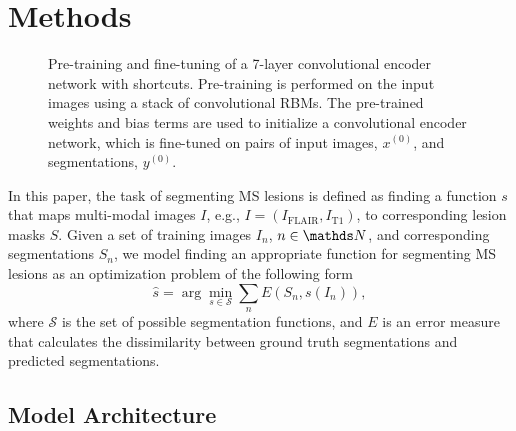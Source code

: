 \section{Methods}
\label{sec:method}

\begin{figure*}[tb]
\centering


\caption{Pre-training and fine-tuning of a 7-layer convolutional encoder network
with shortcuts. Pre-training is performed on the input images using a stack of
convolutional RBMs. The pre-trained weights and bias terms are used to initialize
a convolutional encoder network, which is fine-tuned on pairs of input images,
$x^{(0)}$, and segmentations, $y^{(0)}$.}

\label{fig:network}
\end{figure*}

In this paper, the task of segmenting MS lesions is defined as finding a
function $s$ that maps multi-modal images $I$, e.g., $I = (I_\text{FLAIR},
I_\text{T1})$, to corresponding lesion masks $S$. Given a set of
training images $I_n$, $n \in \N$, and corresponding segmentations $S_n$, we
model finding an appropriate function for segmenting MS lesions as an
optimization problem of the following form
\begin{equation}
\hat{s} = \arg \min_{s \in \mathcal{S}} \sum_n E(S_n, s(I_n)),
\label{eq:segprob}
\end{equation}
where $\mathcal{S}$ is the set of possible segmentation functions, and $E$ is an
error measure that calculates the dissimilarity between ground truth
segmentations and predicted segmentations.

\subsection{Model Architecture}

